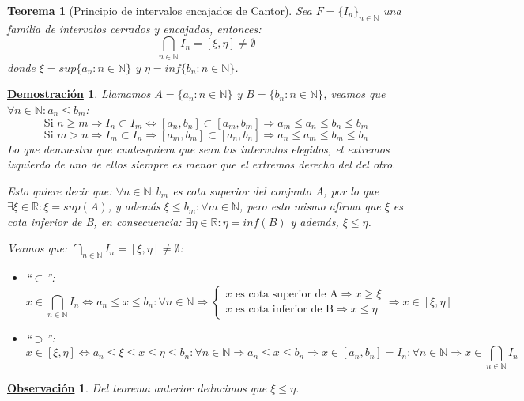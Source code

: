 \documentclass[10pt,a4paper,openright]{book}
\theoremstyle{break}
\newtheorem{theo}{Teorema}[chapter]
\newtheorem*{demo}{\underline{Demostración}}
\newtheorem{obs}{\underline{Observación}}[chapter]
\begin{document}
\begin{theo}[Principio de intervalos encajados de Cantor]
Sea $F=\{I_n\}_{n\in \mathbb N}$ una familia de intervalos cerrados y encajados, entonces:
$$\bigcap_{n\in \mathbb N}I_n = [\xi, \eta] \neq \emptyset$$
donde $\xi=sup\{a_n: n\in \mathbb N\}$ y $\eta=inf\{b_n: n\in \mathbb N\}$.
\end{theo}
\begin{demo}
Llamamos $A=\{a_n: n\in \mathbb N\}$ y $B=\{b_n: n\in \mathbb N\}$, veamos que $\forall n\in \mathbb N: a_n\leq b_m$:
$$\mbox{Si }n\geq m\Rightarrow I_n\subset I_m\Leftrightarrow [a_n,b_n]\subset [a_m, b_m]\Rightarrow a_m\leq a_n\leq b_n\leq b_m$$
$$\mbox{Si }m>n\Rightarrow I_m\subset I_n\Rightarrow [a_m,b_m]\subset[a_n,b_n]\Rightarrow a_n\leq a_m\leq b_m\leq b_n$$
Lo que demuestra que cualesquiera que sean los intervalos elegidos, el extremos izquierdo de uno de ellos siempre es menor que el extremos derecho del del otro.\par 
Esto quiere decir que: $\forall n\in \mathbb N: b_m$ es cota superior del conjunto A, por lo que $\exists \xi\in \mathbb R: \xi=sup (A)$, y además $\xi\leq b_m :\forall m\in \mathbb N$, pero esto mismo afirma que $\xi$ es cota inferior de B, en consecuencia: $\exists \eta\in \mathbb R: \eta=inf(B)$ y además, $\xi\leq\eta$.\par
Veamos que: $\bigcap_{n\in \mathbb N}I_n=[\xi, \eta]\neq \emptyset$:
\begin{itemize}
\item ``$\subset$'':
$$x\in \bigcap_{n\in \mathbb N}I_n\Leftrightarrow a_n\leq x\leq b_n: \forall n \in \mathbb N\Rightarrow\begin{cases} x \mbox{ es cota superior de A}\Rightarrow x\geq\xi \\
x\mbox{ es cota inferior de B}\Rightarrow x\leq \eta\end{cases}\Rightarrow x\in [\xi,\eta]$$

\item ``$\supset$'':
$$x\in [\xi,\eta]\Leftrightarrow a_n\leq \xi\leq x\leq \eta\leq b_n: \forall n \in \mathbb N\Rightarrow a_n\leq x\leq b_n\Rightarrow x\in [a_n,b_n]=I_n: \forall n\in \mathbb N\Rightarrow x\in \bigcap_{n\in \mathbb N}I_n$$
\end{itemize}
\end{demo}

\begin{obs}
Del teorema anterior deducimos que $\xi\leq \eta$.
\end{obs}
\end{document}
